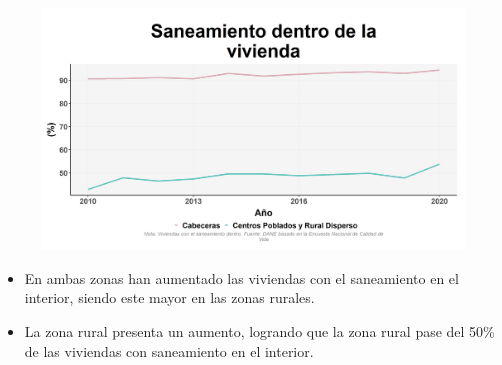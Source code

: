     \begin{figure}[H]
        \caption[Saneamiento dentro de la vivienda por zonas ]{\label{saneamiento_dentro_zonas} }
        \begin{center}
        \includegraphics[width=\textwidth,keepaspectratio]{img/var_194_trend.png}
        \end{center}
    \end{figure}
            \begin{itemize}
                    \item En ambas zonas han aumentado las viviendas con el saneamiento en el interior, siendo este mayor en las zonas rurales.
                    \item La zona rural presenta un aumento, logrando que la zona rural pase del 50\% de las viviendas con saneamiento en el interior.
                    \end{itemize}

